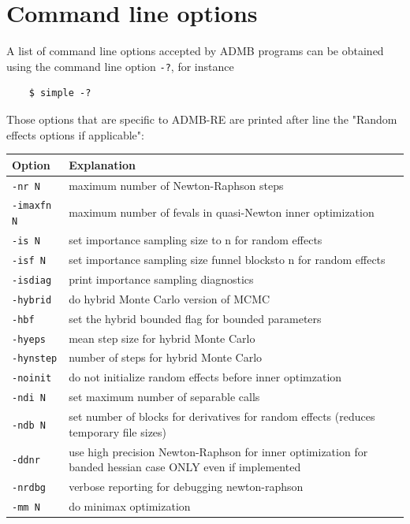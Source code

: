 \documentclass[12pt,letter,reqno]{book}
\begin{document}
\chapter{Command line options}
\label{sec:command_line_options}
 A list of command line options accepted by ADMB programs can
be obtained using the command line option \texttt{-?}, for instance 
\begin{lstlisting}
    $ simple -?
\end{lstlisting}
Those options that are specific to ADMB-RE are printed after line the "Random effects options if applicable": 
\nopagebreak
\begin{center}
\begin{tabular}{ll}
\hline \textbf{Option}& \textbf{Explanation}\\ \hline
\texttt{-nr N} &           maximum number of Newton-Raphson steps\\
\texttt{-imaxfn N} &       maximum number of fevals in quasi-Newton inner optimization\\
\texttt{-is N} &           set importance sampling size to n for random effects\\
\texttt{-isf N} &          set importance sampling size funnel blocksto n for random effects\\
\texttt{-isdiag} &         print importance sampling diagnostics\\
\texttt{-hybrid} &         do hybrid Monte Carlo version of MCMC\\
\texttt{-hbf} &            set the hybrid bounded flag for bounded parameters\\
\texttt{-hyeps} &          mean step size for hybrid Monte Carlo\\
\texttt{-hynstep} &        number of steps for hybrid Monte Carlo\\
\texttt{-noinit} &         do not initialize random effects before inner optimzation\\
\texttt{-ndi N} &          set maximum number of separable calls\\
\texttt{-ndb N} &          set number of blocks for derivatives for random effects (reduces temporary file sizes)\\
\texttt{-ddnr} &           use high precision Newton-Raphson for inner optimization for banded hessian case ONLY even if implemented\\
\texttt{-nrdbg} &           verbose reporting for debugging newton-raphson\\
\texttt{-mm N} &          do minimax optimization\\

\end{tabular}
\end{center}
\end{document}
